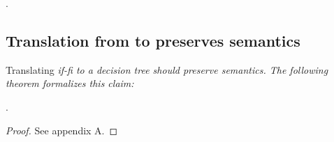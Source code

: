 \documentclass[manuscript,screen,review, 12pt, nonacm]{acmart}
\begin{document}
    
    
    
    
    .

    \subsection{Translation from \VMinus to \D preserves semantics}
    
    Translating \it{if-fi} to a decision tree should preserve semantics. The
    following theorem formalizes this claim: 

    . 
    
    \begin{proof}
        See appendix A. 
    \end{proof}
\end{document}
